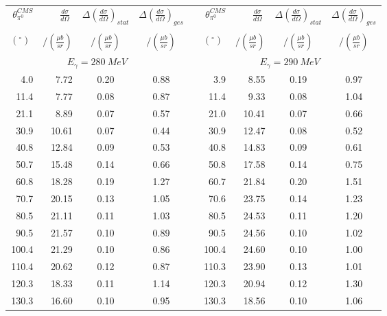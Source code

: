 \begin{table}[htbp] 
\begin{center} 
\begin{tabular}{|r|r|c|c|l|r|r|c|c|} 

\cline{1-4}
\cline{6-9} 
$\theta_{\pi^0}^{CMS}$ & 
$\displaystyle\frac{d\sigma}{d\Omega}\;$ & 
${\Delta}\left( \frac{d\sigma}{d\Omega}\right)_{stat}$ & 
${\Delta}\left( \frac{d\sigma}{d\Omega}\right)_{ges}$ & & 
$\theta_{\pi^0}^{CMS}$ & 
$\displaystyle\frac{d\sigma}{d\Omega}\;$ & 
${\Delta}\left( \frac{d\sigma}{d\Omega}\right)_{stat}$ & 
${\Delta}\left( \frac{d\sigma}{d\Omega}\right)_{ges}$ \\ 
& & & & & & & &\\ 
 $(^{\circ})\;$ & $/(\frac{{\mu}b}{sr})$ & $/(\frac{{\mu}b}{sr})$ & $/(\frac{{\mu}b}{sr})$ & & $(^{\circ})\;$ & $/(\frac{{\mu}b}{sr})$ & $/(\frac{{\mu}b}{sr})$ & $/(\frac{{\mu}b}{sr})$ \\ 
\cline{1-4} 
\cline{6-9} 
\multicolumn{4}{|c|}{ $E_{\gamma}=280~MeV$} & & 
\multicolumn{4}{c|}{ $E_{\gamma}=290~MeV$} \\ 
\cline{1-4} 
\cline{6-9} 
  4.0 &  7.72 &  0.20 &  0.88 & &   3.9 &  8.55 &  0.19 &  0.97 \\ 
 11.4 &  7.77 &  0.08 &  0.87 & &  11.4 &  9.33 &  0.08 &  1.04 \\ 
 21.1 &  8.89 &  0.07 &  0.57 & &  21.0 & 10.41 &  0.07 &  0.66 \\ 
 30.9 & 10.61 &  0.07 &  0.44 & &  30.9 & 12.47 &  0.08 &  0.52 \\ 
 40.8 & 12.84 &  0.09 &  0.53 & &  40.8 & 14.83 &  0.09 &  0.61 \\ 
 50.7 & 15.48 &  0.14 &  0.66 & &  50.8 & 17.58 &  0.14 &  0.75 \\ 
 60.8 & 18.28 &  0.19 &  1.27 & &  60.7 & 21.84 &  0.20 &  1.51 \\ 
 70.7 & 20.15 &  0.13 &  1.05 & &  70.6 & 23.75 &  0.14 &  1.23 \\ 
 80.5 & 21.11 &  0.11 &  1.03 & &  80.5 & 24.53 &  0.11 &  1.20 \\ 
 90.5 & 21.57 &  0.10 &  0.89 & &  90.5 & 24.56 &  0.10 &  1.02 \\ 
100.4 & 21.29 &  0.10 &  0.86 & & 100.4 & 24.60 &  0.10 &  1.00 \\ 
110.4 & 20.62 &  0.12 &  0.87 & & 110.3 & 23.90 &  0.13 &  1.01 \\ 
120.3 & 18.33 &  0.11 &  1.14 & & 120.3 & 20.94 &  0.12 &  1.30 \\ 
130.3 & 16.60 &  0.10 &  0.95 & & 130.3 & 18.56 &  0.10 &  1.06 \\ 

\end{tabular}
\end{center}
\end{table}
